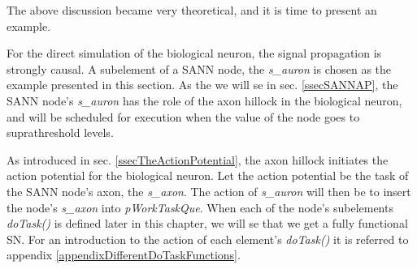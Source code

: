 	The above discussion became very theoretical, and it is time to present an example. 

	For the direct simulation of the biological neuron, the signal propagation is strongly causal.
	A subelement of a SANN node, the \emph{s\_auron} is chosen as the example presented in this section.
	As the we will se in sec. \ref{ssecSANNAP}, the SANN node's \emph{s\_auron} has the role of the axon hillock in the biological neuron, and will be scheduled for execution when the value of the node goes to suprathreshold levels.

	As introduced in sec. \ref{ssecTheActionPotential}, the axon hillock initiates the action potential for the biological neuron.
	Let the action potential be the task of the SANN node's axon, the \emph{s\_axon}.
	The action of \emph{s\_auron} will then be to insert the node's \emph{s\_axon} into \emph{pWorkTaskQue}.
	When each of the node's subelements \emph{doTask()} is defined later in this chapter, we will se that we get a fully functional SN. %
	For an introduction to the action of each element's \emph{doTask()} it is referred to appendix \ref{appendixDifferentDoTaskFunctions}. %


	
